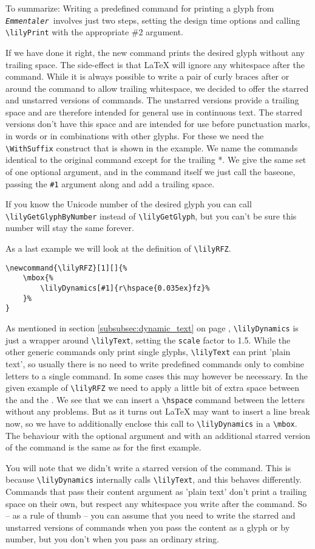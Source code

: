 \documentclass{article}
\newcommand*{\emmentaler}{\texttt{\textit{Emmentaler }}}
\newcommand*{\cmd}[1]{\texttt{\textbackslash #1}}
\begin{document}
To summarize: Writing a predefined command for printing a glyph from \emmentaler involves just two steps, setting the design time options and calling \cmd{lilyPrint} with the appropriate \#2 argument.

\medskip
If we have done it right, the new command prints the desired glyph without any trailing space. 
The side-effect is that \LaTeX{} will ignore any whitespace after the command.
While it is always possible to write a pair of curly braces after or around the command to allow trailing whitespace, we decided to offer the starred and unstarred versions of commands.
The unstarred versions provide a trailing space and are therefore intended for general use in continuous text. 
The starred versions don't have this space and are intended for use before punctuation marks, in words or in combinations with other glyphs.
For these we need the \cmd{WithSuffix} construct that is shown in the example.
We name the commands identical to the original command except for the trailing *.
We give the same set of one optional argument, and in the command itself we just call the baseone, passing the \texttt{\#1} argument along and add a trailing space.

\medskip
If you know the Unicode number of the desired glyph you can call \cmd{lilyGetGlyphByNumber} instead of \cmd{lilyGetGlyph}, but you can't be sure this number will stay the same forever.

\medskip
As a last example we will look at the definition of \lilyRFZ \cmd{lilyRFZ}.

\begin{verbatim}
\newcommand{\lilyRFZ}[1][]{%
	\mbox{%
		\lilyDynamics[#1]{r\hspace{0.035ex}fz}%
	}%
}
\end{verbatim}
As mentioned in section \ref{subsubsec:dynamic_text} on page \pageref{subsubsec:dynamic_text}, \cmd{lilyDynamics} is just a wrapper around \cmd{lilyText}, setting the \texttt{scale} factor to 1.5.
While the other generic commands only print single glyphs, \cmd{lilyText} can print 'plain text', so usually there is no need to write predefined commands only to combine letters to a single command.
In some cases this may however be necessary.
In the given example of \cmd{lilyRFZ} we need to apply a little bit of extra space between the  and the .
We see that we can insert a \cmd{hspace} command between the letters without any problems.
But as it turns out \LaTeX{} may want to insert a line break now, so we have to additionally enclose this call to \cmd{lilyDynamics} in a \cmd{mbox}.
The behaviour with the optional argument and with an additional starred version of the command is the same as for the first example.

You will note that we didn't write a starred version of the command.
This is because \cmd{lilyDynamics} internally calls \cmd{lilyText}, and this behaves differently. 
Commands that pass their content argument as 'plain text' don't print a trailing space on their own, but respect any whitespace you write after the command.
So -- as a rule of thumb -- you can assume that you need to write the starred and unstarred versions of commands when you pass the content as a glyph or by number, but you don't when you pass an ordinary string.
\end{document}
